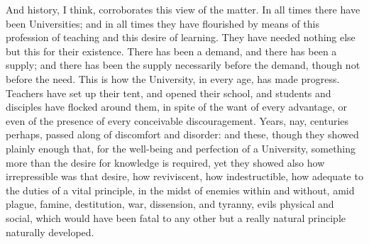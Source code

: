 And history, I think, corroborates this view of the matter. In all
times there have been Universities; and in all times they have
flourished by means of this profession of teaching and this desire of
learning. They have needed nothing else but this for their existence.
There has been a demand, and there has been a supply; and there has
been the supply necessarily before the demand, though not before the
need. This is how the University, in every age, has made progress.
Teachers have set up their tent, and opened their school, and students
and disciples have flocked around them, in spite of the want of every
advantage, or even of the presence of every conceivable
discouragement. Years, nay, centuries perhaps, passed along of
discomfort and disorder: and these, though they showed plainly enough
that, for the well-being and perfection of a University, something
more than the desire for knowledge is required, yet they showed also
how irrepressible was that desire, how reviviscent, how
indestructible, how adequate to the duties of a vital principle, in
the midst of enemies within and without, amid plague, famine,
destitution, war, dissension, and tyranny, evils physical and social,
which would have been fatal to any other but a really natural
principle naturally developed.

